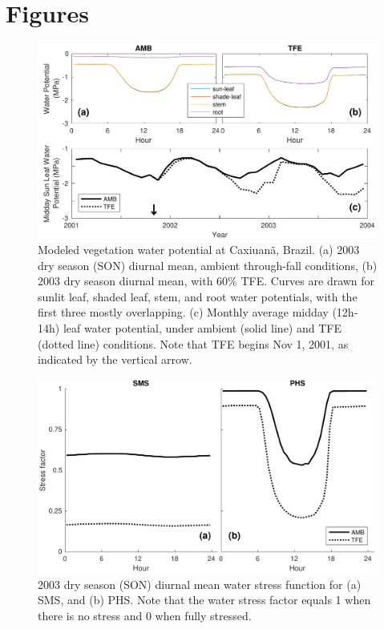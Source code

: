 \documentclass[draft,linenumbers]{agujournal}
\begin{document}
\section{Figures}
  \begin{figure}[h]
     \centering
     \includegraphics[width=30pc]{../figs3/vwp.pdf}
     \caption{Modeled vegetation water potential at  Caxiuan\~a, Brazil.
     (a) 2003 dry season (SON) diurnal mean, ambient through-fall conditions,
     (b) 2003 dry season diurnal mean, with 60\% TFE.
     Curves are drawn for sunlit leaf, shaded leaf, stem, and root water potentials, with the first three mostly overlapping.
     (c) Monthly average midday (12h-14h) leaf water potential, under ambient (solid line) and TFE (dotted line) conditions.
     Note that TFE begins Nov 1, 2001, as indicated by the vertical arrow. 
     }
     \label{fig:vwp}
  \end{figure}

  
    \clearpage
    \begin{figure}[h]
     \centering
     \includegraphics[width=30pc]{../figs3/fig4.pdf}
     \caption{2003 dry season (SON) diurnal mean water stress function for 
     (a) SMS, and
     (b) PHS.
     Note that the water stress factor equals 1 when there is no stress and 0 when fully stressed.
     }
     \label{fig:stress1}
  \end{figure}
  
\end{document}
